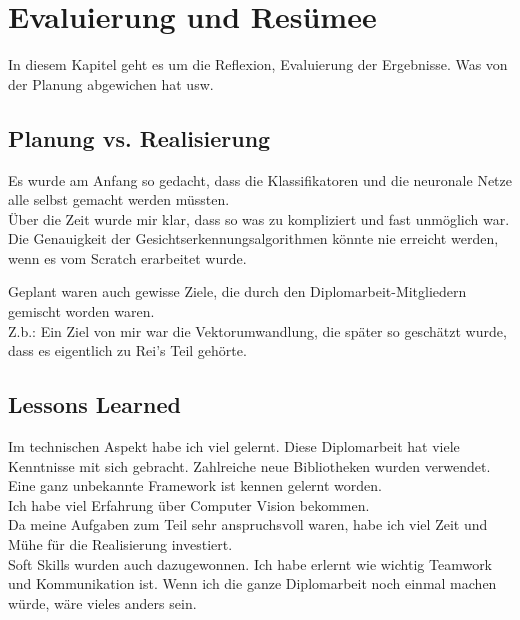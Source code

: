\section{Evaluierung und Resümee}
\begin{flushleft}
	In diesem Kapitel geht es um die Reflexion, Evaluierung der Ergebnisse. Was von der Planung abgewichen hat usw. 
\end{flushleft}
\subsection{Planung vs. Realisierung}
\begin{flushleft}
Es wurde am Anfang so gedacht, dass die Klassifikatoren und die neuronale Netze alle selbst gemacht werden müssten. \\

Über die Zeit wurde mir klar, dass so was zu kompliziert und fast unmöglich war.\\

Die Genauigkeit der Gesichtserkennungsalgorithmen könnte nie erreicht werden, wenn es vom Scratch erarbeitet wurde. 

Geplant waren auch gewisse Ziele, die durch den Diplomarbeit-Mitgliedern gemischt worden waren. \\

Z.b.: Ein Ziel von mir war die Vektorumwandlung, die später so geschätzt wurde, dass es eigentlich zu Rei's Teil gehörte. \\
	
	
\end{flushleft}
\subsection{Lessons Learned}
\begin{flushleft}
	Im technischen Aspekt habe ich viel gelernt.
	Diese Diplomarbeit hat viele Kenntnisse mit sich gebracht. Zahlreiche neue Bibliotheken wurden verwendet. \\
	Eine ganz unbekannte Framework ist kennen gelernt worden. \\
	Ich habe viel Erfahrung über Computer Vision bekommen.\\
	Da meine Aufgaben zum Teil sehr anspruchsvoll waren, habe ich viel Zeit und Mühe für die Realisierung investiert.\\
	Soft Skills wurden auch dazugewonnen. Ich habe erlernt wie wichtig Teamwork und Kommunikation ist. 
	Wenn ich die ganze Diplomarbeit noch einmal machen würde, wäre vieles anders sein. 
	  
	
	
\end{flushleft}

